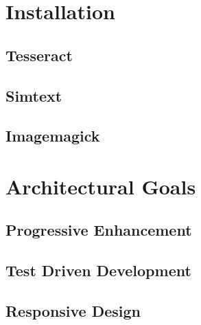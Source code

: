 \section{Installation}
\subsection{Tesseract}
\subsection{Simtext}
\subsection{Imagemagick}



\section{Architectural Goals}

\subsection{Progressive Enhancement}

\subsection{Test Driven Development}

\subsection{Responsive Design}